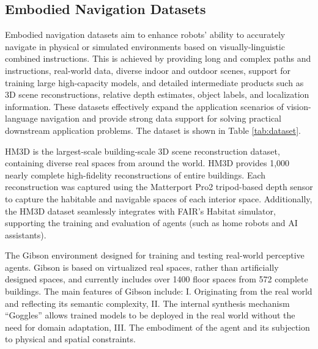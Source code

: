\subsection{Embodied Navigation Datasets}
Embodied navigation datasets aim to enhance robots' ability to accurately navigate in physical or simulated environments based on visually-linguistic combined instructions. This is achieved by providing long and complex paths and instructions, real-world data, diverse indoor and outdoor scenes, support for training large high-capacity models, and detailed intermediate products such as 3D scene reconstructions, relative depth estimates, object labels, and localization information. These datasets effectively expand the application scenarios of vision-language navigation and provide strong data support for solving practical downstream application problems. The dataset is shown in Table \ref{tab:dataset}.

HM3D \cite{ramakrishnan2021habitat} is the largest-scale building-scale 3D scene reconstruction dataset, containing diverse real spaces from around the world. HM3D provides 1,000 nearly complete high-fidelity reconstructions of entire buildings. Each reconstruction was captured using the Matterport Pro2 tripod-based depth sensor to capture the habitable and navigable spaces of each interior space. Additionally, the HM3D dataset seamlessly integrates with FAIR's Habitat simulator, supporting the training and evaluation of agents (such as home robots and AI assistants).

The Gibson environment \cite{xia2018gibson} designed for training and testing real-world perceptive agents. Gibson is based on virtualized real spaces, rather than artificially designed spaces, and currently includes over 1400 floor spaces from 572 complete buildings. The main features of Gibson include: I. Originating from the real world and reflecting its semantic complexity, II. The internal synthesis mechanism ``Goggles'' allows trained models to be deployed in the real world without the need for domain adaptation, III. The embodiment of the agent and its subjection to physical and spatial constraints.

